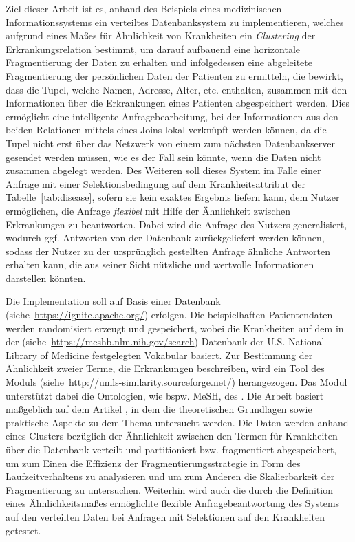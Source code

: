 \documentclass[a4paper, 11pt]{article}
\begin{document}
Ziel dieser Arbeit ist es, anhand des Beispiels eines medizinischen Informationssystems ein verteiltes Datenbanksystem zu implementieren, welches aufgrund 
eines Maßes für Ähnlichkeit von Krankheiten ein \emph{Clustering} der Erkrankungsrelation bestimmt, um darauf aufbauend eine horizontale Fragmentierung der 
Daten zu erhalten und infolgedessen eine abgeleitete Fragmentierung der persönlichen Daten der Patienten zu ermitteln, die bewirkt, dass die Tupel, welche 
Namen, Adresse, Alter, etc. enthalten, zusammen mit den Informationen über die Erkrankungen eines Patienten abgespeichert werden.
Dies ermöglicht eine intelligente Anfragebearbeitung, bei der Informationen aus den beiden Relationen mittels eines Joins lokal verknüpft werden können, 
da die Tupel nicht erst über das Netzwerk von einem zum nächsten Datenbankserver gesendet werden müssen, wie es der Fall sein könnte, wenn die Daten nicht
zusammen abgelegt werden. Des Weiteren soll dieses System im Falle einer Anfrage mit einer Selektionsbedingung auf dem Krankheitsattribut der 
Tabelle~\ref{tab:disease}, sofern sie kein exaktes Ergebnis liefern kann, dem Nutzer ermöglichen, die Anfrage \emph{flexibel} mit Hilfe der Ähnlichkeit 
zwischen Erkrankungen zu beantworten. Dabei wird die Anfrage des Nutzers generalisiert, wodurch ggf. Antworten von der Datenbank zurückgeliefert werden können,
sodass der Nutzer zu der ursprünglich gestellten Anfrage ähnliche Antworten erhalten kann, die aus seiner Sicht nützliche und wertvolle Informationen 
darstellen könnten.


Die Implementation soll auf Basis einer  Datenbank (siehe~\url{https://ignite.apache.org/}) erfolgen. Die beispielhaften Patientendaten 
werden randomisiert erzeugt und gespeichert, wobei die Krankheiten auf dem in der 
(siehe~\url{https://meshb.nlm.nih.gov/search}) Datenbank der U.S. National Library of Medicine festgelegten Vokabular basiert. Zur Bestimmung der Ähnlichkeit
zweier Terme, die Erkrankungen beschreiben, wird ein Tool des  Moduls (siehe~\url{http://umls-similarity.sourceforge.net/}) herangezogen.
Das Modul unterstützt dabei die Ontologien, wie bspw. MeSH, des .
Die Arbeit basiert maßgeblich auf dem Artikel \citet{Wiese2014}, in dem die theoretischen Grundlagen sowie praktische Aspekte zu dem Thema untersucht werden.
Die Daten werden anhand eines Clusters bezüglich der Ähnlichkeit zwischen den Termen für Krankheiten über die Datenbank verteilt und partitioniert bzw. 
fragmentiert abgespeichert, um zum Einen die Effizienz der Fragmentierungsstrategie in Form des Laufzeitverhaltens zu analysieren und um zum Anderen die 
Skalierbarkeit der Fragmentierung zu untersuchen. Weiterhin wird auch die durch die Definition eines Ähnlichkeitsmaßes ermöglichte flexible Anfragebeantwortung
des Systems auf den verteilten Daten bei Anfragen mit Selektionen auf den Krankheiten getestet.
\end{document}
